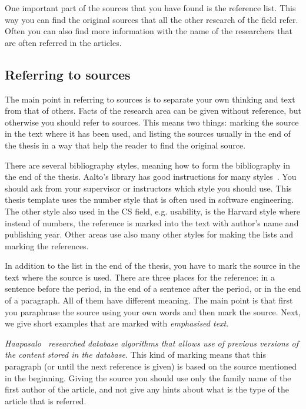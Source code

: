 \documentclass[12pt,a4paper,oneside,pdftex]{report}
\begin{document}
One important part of the sources that you have found is the reference
list. This way you can find the original sources that all the other
research of the field refer. Often you can also find more information
with the name of the researchers that are often referred in the
articles.

\subsection{Referring to sources}

The main point in referring to sources is to separate your own
thinking and text from that of others. Facts of the research area can
be given without reference, but otherwise you should refer to
sources. This means two things: marking the source in the text where
it has been used, and listing the sources usually in the end of the
thesis in a way that help the reader to find the original source.

There are several bibliography styles, meaning how to form the
bibliography in the end of the thesis. Aalto's library has good
instructions for many styles~\cite{bibinstructions}. You should ask
from your supervisor or instructors which style you should use. This
thesis template uses the number style that is often used in software
engineering. The other style also used in the CS field,
e.g. usability, is the Harvard style where instead of numbers, the
reference is marked into the text with author's name and publishing
year. Other areas use also many other styles for making the lists and
marking the references.

In addition to the list in the end of the thesis, you have to mark the
source in the text where the source is used. There are three places
for the reference: in a sentence before the period, in the end of a
sentence after the period, or in the end of a paragraph. All of them
have different meaning. The main point is that first you paraphrase
the source using your own words and then mark the source. Next, we
give short examples that are marked with \emph{emphasised text}.

\emph{Haapasalo~\cite{HaapasaloThesis} researched database algorithms
  that allows use of previous versions of the content stored in the
  database.} This kind of marking means that this paragraph (or until
the next reference is given) is based on the source mentioned in the
beginning.  Giving the source you should use only the family name of
the first author of the article, and not give any hints about what is
the type of the article that is referred.
\end{document}
